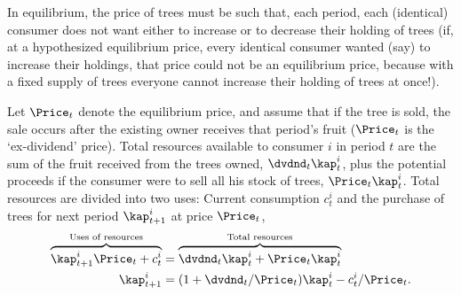 \documentclass{handout}
\begin{document}
In equilibrium, the price of trees must be such that, each period,
each (identical) consumer does not want either to increase or to
decrease their holding of trees (if, at a hypothesized equilibrium price, every
identical consumer wanted (say) to increase their holdings, that price could not be an equilibrium price, because with a fixed supply of trees everyone cannot increase their holding of trees at once!).

Let $\Price_{t}$ denote the equilibrium price, and assume that if the tree is sold, the sale occurs after the existing owner receives that period's fruit ($\Price_{t}$ is the `ex-dividend' price).  Total resources available to consumer $i$ in period $t$ are the sum of the fruit received from the trees owned, $\dvdnd_{t}\kap_{t}^{i}$, plus the potential proceeds if the consumer were to sell all his stock of trees, $\Price_{t}\kap_{t}^{i}$.  Total resources are divided into two uses: Current consumption $c_{t}^{i}$ and the purchase of trees for next period $\kap_{t+1}^{i}$ at price $\Price_{t}$,
\begin{equation}\begin{gathered}\begin{aligned}
\overbrace{\kap_{t+1}^{i}\Price_{t}+c_{t}^{i}}^{\text{Uses of resources}}     & =  \overbrace{\dvdnd_{t}\kap_{t}^{i}+\Price_{t}\kap_{t}^{i}}^{\text{Total resources}} 
\\      \kap_{t+1}^{i} & =  (1+\dvdnd_{t}/\Price_{t})\kap_{t}^{i}-c_{t}^{i}/\Price_{t}.
\end{aligned}\end{gathered}\end{equation}

\pagebreak
\end{document}
